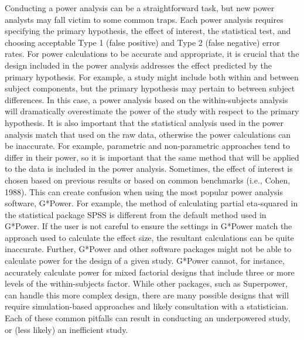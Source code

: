 \documentclass[
  doc, donotrepeattitle,floatsintext]{apa7}
\begin{document}
Conducting a power analysis can be a straightforward task, but new power analysts may fall victim to some common traps. Each power analysis requires specifying the primary hypothesis, the effect of interest, the statistical test, and choosing acceptable Type 1 (false positive) and Type 2 (false negative) error rates. For power calculations to be accurate and appropriate, it is crucial that the design included in the power analysis addresses the effect predicted by the primary hypothesis. For example, a study might include both within and between subject components, but the primary hypothesis may pertain to between subject differences. In this case, a power analysis based on the within-subjects analysis will dramatically overestimate the power of the study with respect to the primary hypothesis. It is also important that the statistical analysis used in the power analysis match that used on the raw data, otherwise the power calculations can be inaccurate. For example, parametric and non-parametric approaches tend to differ in their power, so it is important that the same method that will be applied to the data is included in the power analysis. Sometimes, the effect of interest is chosen based on previous results or based on common benchmarks (i.e., Cohen, 1988). This can create confusion when using the most popular power analysis software, G*Power. For example, the method of calculating partial eta-squared in the statistical package SPSS is different from the default method used in G*Power. If the user is not careful to ensure the settings in G*Power match the approach used to calculate the effect size, the resultant calculations can be quite inaccurate. Further, G*Power and other software packages might not be able to calculate power for the design of a given study. G*Power cannot, for instance, accurately calculate power for mixed factorial designs that include three or more levels of the within-subjects factor. While other packages, such as Superpower, can handle this more complex design, there are many possible designs that will require simulation-based approaches and likely consultation with a statistician. Each of these common pitfalls can result in conducting an underpowered study, or (less likely) an inefficient study.
\end{document}
